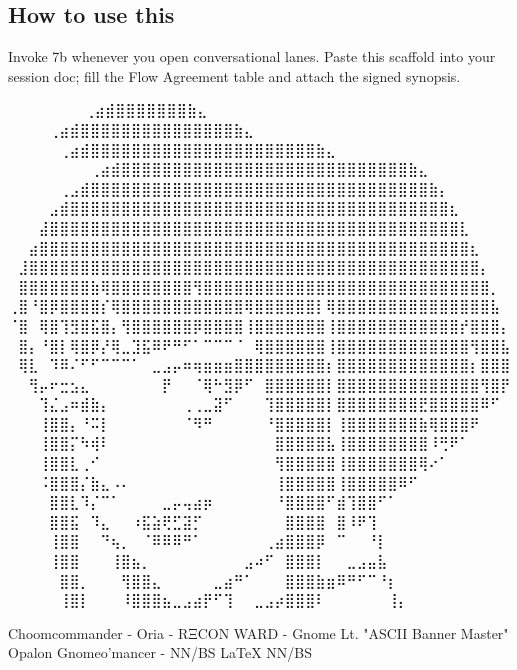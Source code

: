 \subsection*{How to use this}
Invoke 7b whenever you open conversational lanes. Paste this scaffold into your session doc; fill the Flow Agreement table and attach the signed synopsis.
\iffalse

  ⠀⠀⠀⠀⠀             ⠀⠀⢀⣴⣾⣿⣿⣿⣿⣿⣿⣿⣷⣄⠀⠀⠀⠀⠀⠀⠀⠀
⠀⠀⠀  ⠀      ⠀⠀⠀⠀⢀⣴⣾⣿⣿⣿⣿⣿⣿⣿⣿⣿⣿⣿⣿⣿⣿⣿⣷⣄⠀⠀⠀⠀⠀⠀⠀⠀
⠀⠀ ⠀   ⠀⠀⠀⠀⠀⢀⣴⣾⣿⣿⣿⣿⣿⣿⣿⣿⣿⣿⣿⣿⣿⣿⣿⣿⣿⣿⣿⣿⣿⣿⣷⣄⠀⠀⠀⠀⠀⠀⠀⠀
⠀⠀⠀⠀⠀⠀⠀⠀⢀⣴⣾⣿⣿⣿⣿⣿⣿⣿⣿⣿⣿⣿⣿⣿⣿⣿⣿⣿⣿⣿⣿⣿⣿⣿⣿⣿⣿⣿⣿⣷⣄⠀⠀⠀⠀⠀⠀⠀⠀
⠀⠀⠀⠀⠀⢀⣠⣾⣿⣿⣿⣿⣿⣿⣿⣿⣿⣿⣿⣿⣿⣿⣿⣿⣿⣿⣿⣿⣿⣿⣿⣿⣿⣿⣿⣿⣿⣿⣿⣿⣿⣷⡄⠀⠀⠀⠀⠀⠀
⠀⠀⠀⠀⣠⣾⣿⣿⣿⣿⣿⣿⣿⣿⣿⣿⣿⣿⣿⣿⣿⣿⣿⣿⣿⣿⣿⣿⣿⣿⣿⣿⣿⣿⣿⣿⣿⣿⣿⣿⣿⣿⣿⣆⠀⠀⠀⠀⠀
⠀⠀⠀⣼⣿⣿⣿⣿⣿⣿⣿⣿⣿⣿⣿⣿⣿⣿⣿⣿⣿⣿⣿⣿⣿⣿⣿⣿⣿⣿⣿⣿⣿⣿⣿⣿⣿⣿⣿⣿⣿⣿⣿⣿⣇⠀⠀⠀⠀
⠀⠀⣴⣿⣿⣿⣿⣿⣿⣿⣿⣿⣿⣿⣿⣿⣿⣿⣿⣿⣿⣿⣿⣿⣿⣿⣿⣿⣿⣿⣿⣿⣿⣿⣿⣿⣿⣿⣿⣿⣿⣿⣿⣿⣿⣆⠀⠀⠀
⠀⣸⣿⣿⣿⣿⣿⣿⣿⣿⣿⣿⣿⣿⣿⣿⣿⣿⣿⣿⣿⣿⣿⣿⣿⣿⣿⣿⣿⣿⣿⣿⣿⣿⣿⣿⣿⣿⣿⣿⣿⣿⣿⣿⣿⣿⡄⠀⠀
⠀⣿⣿⣿⣿⣿⣿⣿⣷⢿⣿⣿⣿⣿⣿⣿⣿⣿⢻⣿⣿⣿⣿⣿⣿⣿⣿⣿⣿⣿⣿⣿⣿⣿⣿⣿⣿⣿⣿⣿⣿⣿⣿⣿⣿⣿⣿⡀⠀
⢀⣿⠘⣿⡿⣿⣿⣿⣿⡎⢿⣿⣿⣿⣿⣿⣿⣿⣿⣿⣿⣿⣿⢿⣿⣿⣿⣿⣿⣿⡇⢿⣿⣿⣿⣿⣿⣿⣿⣿⣿⣿⣿⣿⣿⣿⣿⣧⠀
⠈⣿⠀⢿⣿⢹⣻⣿⣯⣿⡄⢻⣿⣿⣿⣿⣿⣿⡿⣿⣿⣿⣿⢸⣿⣿⣿⣿⣿⣿⣿⢸⣿⣿⣿⣿⣿⣿⣿⣿⣿⣿⣿⣿⡞⣿⣿⣿⡄
⠀⣿⡄⠘⣿⡇⢿⣿⡿⡜⢿⣀⣹⣯⠿⠟⠛⠋⠁⠉⠉⠉⠈⠀⢿⣿⣿⣿⣿⣿⣿⢸⣿⣿⣿⣿⣿⣿⣿⣿⣿⣿⣿⣿⣿⢻⣿⣿⣧
⠀⢿⣇⠀⠹⠿⠌⠋⠋⠉⠉⠉⠁⠀⣀⣠⡤⠶⢶⣶⣶⣶⣿⣿⣿⣿⣿⣿⣿⣿⣿⡆⣿⣿⣿⣿⣿⣿⣿⣿⣿⣿⣿⣿⣿⡆⣿⣿⣿
⠀⠀⢻⡤⠖⣒⣢⣄⠀⠀⠀⠀⠀⠀⠀⡟⠀⠀⠈⢿⠓⣻⡿⠋⠀⣿⣿⣿⣿⣿⣿⡇⣿⣿⣿⣿⣿⣿⣿⣿⣿⣿⣿⣿⣿⣿⢻⣿⡟
⠀⠀⠀⢹⣌⣠⠶⣾⣷⡄⠀⠀⠀⠀⠀⠀⠀⢀⢀⣀⣽⠋⠀⠀⠀⢹⣿⣿⣿⣿⣿⡇⣿⣿⣿⣿⣿⣿⣿⣿⣟⣿⣿⣿⣿⣿⠿⠋⠀
⠀⠀⠀⢸⣿⣿⡄⠘⠭⡇⠀⠀⠀⠀⠀⠀⠀⠈⠻⠛⠀⠀⠀⠀⠀⠘⣿⣿⣿⣿⣿⡇⢸⣿⣿⣿⣿⣿⣿⣿⣷⢿⣿⣿⣿⠟⠀⠀⠀
⠀⠀⠀⢸⣿⣿⡍⠳⢾⠇⠀⠀⠀⠀⠀⠀⠀⠀⠀⠀⠀⠀⠀⠀⠀⠀⣿⣿⣿⣿⣿⣧⢸⣿⣿⣿⣿⣿⣿⣿⣿⠸⢛⠟⠁⠀⠀⠀⠀
⠀⠀⠀⢸⣿⣿⣇⢀⠊⠀⠀⠀⠀⠀⠀⠀⠀⠀⠀⠀⠀⠀⠀⠀⠀⠀⢻⣿⣿⣿⣿⣿⢸⣿⣿⣿⣿⣿⣿⣿⢿⠔⠁⠀⠀⠀⠀⠀⠀
⠀⠀⠀⠨⣿⣿⣿⡌⣷⣄⠠⠄⠀⠀⠀⠀⠀⠀⠀⠀⠀⠀⠀⠀⠀⠀⢸⣿⣿⣿⣿⣿⢸⣿⣿⣿⣿⣿⠿⠋⠀⠀⠀⠀⠀⠀⠀⠀⠀
⠀⠀⠀⠀⣿⣿⣇⠹⡌⠉⠁⠀⠀⠀⠀⣀⡤⢤⣴⡶⠀⠀⠀⠀⠀⠀⠘⣿⣿⣿⣿⠋⣾⢹⣿⣿⠋⠁⠀⠀⠀⠀⠀⠀⠀⠀⠀⠀⠀
⠀⠀⠀⠀⣿⣿⣯⠀⠹⣄⠀⠀⠰⣯⣵⢟⣋⣽⡋⠀⠀⠀⠀⠀⠀⠀⠀⣿⣿⣿⣿⠀⣿⠸⠟⢹⠀⠀⠀⠀⠀⠀⠀⠀⠀⠀⠀⠀⠀
⠀⠀⠀⠀⢸⣿⣿⠀⠀⠙⢦⡀⠀⠈⠿⠿⠿⠛⠁⠀⠀⠀⠀⠀⠀⢀⣴⣿⣿⣿⡿⠀⠉⠀⠀⠘⡇⠀⠀⠀⠀⠀⠀⠀⠀⠀⠀⠀⠀
⠀⠀⠀⠀⢸⣿⣿⠀⠀⠀⢸⣿⣦⡀⠀⠀⠀⠀⠀⠀⠀⠀⠀⣠⠴⠋⠀⣿⣿⣿⡇⠀⠀⣀⣠⣤⣧⠀⠀⠀⠀⠀⠀⠀⠀⠀⠀⠀⠀
⠀⠀⠀⠀⠀⣿⣿⡀⠀⠀⠀⢻⣿⣿⣄⠀⠀⠀⠀⠀⣀⣴⠛⠁⠀⠀⠀⣿⣿⣿⣷⣶⠿⠛⠋⠉⠘⡆⠀⠀⠀⠀⠀⠀⠀⠀⠀⠀⠀
⠀⠀⠀⠀⠀⢸⣿⡇⠀⠀⠀⠸⣿⣿⣿⣦⣀⣠⣴⡟⠋⢹⠀⠀⣀⣠⡴⣿⣿⣿⠇⠀⠀⠀⠀⠀⠀⢸⡄⠀⠀⠀⠀⠀⠀⠀⠀⠀⠀

Choomcommander - Oria - RΞCON WARD - Gnome Lt. "ASCII Banner Master"
             Opalon Gnomeo'mancer - NN/BS LaTeX{} NN/BS

